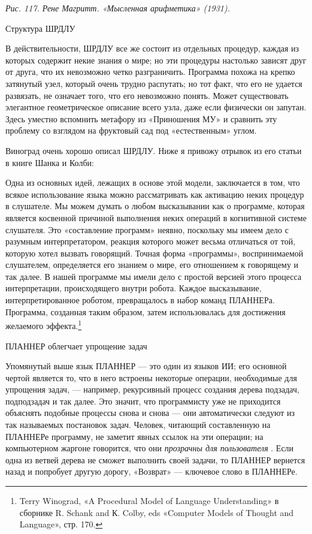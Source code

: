 \emph{Рис. 117. Рене Магритт. «Мысленная арифметика» (1931).}

Структура ШРДЛУ

В действительности, ШРДЛУ все же состоит из отдельных процедур, каждая из которых содержит некие знания о мире; но эти процедуры настолько зависят друг от друга, что их невозможно четко разграничить. Программа похожа на крепко затянутый узел, который очень трудно распутать; но тот факт, что его не удается развязать, не означает того, что его невозможно понять. Может существовать элегантное геометрическое описание всего узла, даже если физически он запутан. Здесь уместно вспомнить метафору из «Приношения МУ» и сравнить эту проблему со взглядом на фруктовый сад под «естественным» углом.

Виноград очень хорошо описал ШРДЛУ. Ниже я привожу отрывок из его статьи в книге Шанка и Колби:

Одна из основных идей, лежащих в основе этой модели, заключается в том, что всякое использование языка можно рассматривать как активацию неких процедур в слушателе. Мы можем думать о любом высказывании как о программе, которая является косвенной причиной выполнения неких операций в когнитивной системе слушателя. Это «составление программ» неявно, поскольку мы имеем дело с разумным интерпретатором, реакция которого может весьма отличаться от той, которую хотел вызвать говорящий. Точная форма «программы», воспринимаемой слушателем, определяется его знанием о мире, его отношением к говорящему и так далее. В нашей программе мы имели дело с простой версией этого процесса интерпретации, происходящего внутри робота. Каждое высказывание, интерпретированное роботом, превращалось в набор команд ПЛАННЕРа. Программа, созданная таким образом, затем использовалась для достижения желаемого эффекта.\footnote{Terry Winograd, «A Procedural Model of Language Understanding» в сборнике R. Schank and К. Colby, eds «Computer Models of Thought and Language», стр. 170.}

ПЛАННЕР облегчает упрощение задач

Упомянутый выше язык ПЛАННЕР --- это один из языков ИИ; его основной чертой является то, что в него встроены некоторые операции, необходимые для упрощения задач, --- например, рекурсивный процесс создания дерева подзадач, подподзадач и так далее. Это значит, что программисту уже не приходится объяснять подобные процессы снова и снова --- они автоматически следуют из так называемых постановок задач. Человек, читающий составленную на ПЛАННЕРе программу, не заметит явных ссылок на эти операции; на компьютерном жаргоне говорится, что они \emph{прозрачны для пользователя} . Если одна из ветвей дерева не сможет выполнить своей задачи, то ПЛАННЕР вернется назад и попробует другую дорогу, «Возврат» --- ключевое слово в ПЛАННЕРе.

